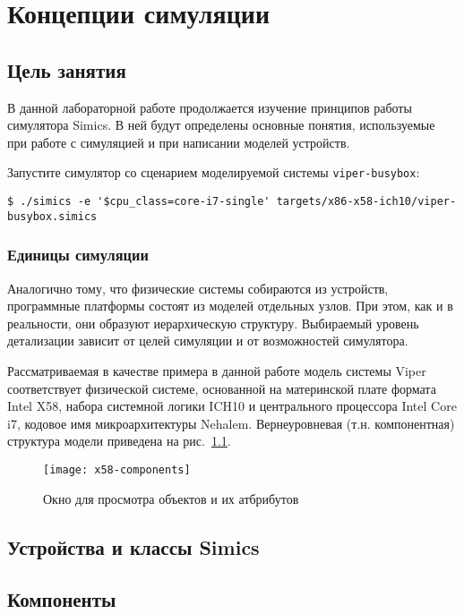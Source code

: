 \chapter{Концепции симуляции}\label{chap:lab02}

\section{Цель занятия}

В данной лабораторной работе продолжается изучение принципов работы симулятора Simics. В ней будут определены основные понятия, используемые при работе с симуляцией и при написании моделей устройств.

Запустите симулятор со сценарием моделируемой системы \texttt{viper-busybox}:

\begin{lstlisting}
$ ./simics -e '$cpu_class=core-i7-single' targets/x86-x58-ich10/viper-busybox.simics
\end{lstlisting}

\subsection{Единицы симуляции} 

Аналогично тому, что физические системы собираются из устройств, программные платформы состоят из моделей отдельных узлов. При этом, как и в реальности, они образуют иерархическую структуру. Выбираемый уровень детализации зависит от целей симуляции и от возможностей симулятора. 

Рассматриваемая в качестве примера в данной работе модель системы Viper соответствует физической системе, основанной на материнской плате формата Intel X58, набора системной логики ICH10 и центрального процессора Intel Core i7, кодовое имя микроархитектуры Nehalem. Вернеуровневая (т.н. компонентная) структура модели приведена на рис.~\ref{fig:x58-components}.

\begin{figure}[htb]
    \centering
    \texttt{[image: x58-components]}
    \caption{Окно для просмотра объектов и их атбрибутов}
    \label{fig:x58-components}
\end{figure}


\section{Устройства и классы Simics}

\section{Компоненты}

